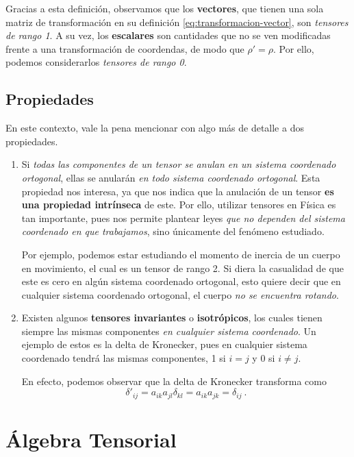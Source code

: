 Gracias a esta definición, observamos que los \textbf{vectores}, que tienen una sola matriz de transformación en su definición \eqref{eq:transformacion-vector}, son \emph{tensores de rango 1}. A su vez, los \textbf{escalares} son cantidades que no se ven modificadas frente a una transformación de coordendas, de modo que $\rho' = \rho$. Por ello, podemos considerarlos \emph{tensores de rango 0}.

\subsection{Propiedades}

En este contexto, vale la pena mencionar con algo más de detalle a dos propiedades.

\begin{enumerate}
    \item Si \emph{todas las componentes de un tensor se anulan en un sistema coordenado ortogonal}, ellas se anularán \emph{en todo sistema coordenado ortogonal}.  Esta propiedad nos interesa, ya que nos indica que la anulación de un tensor \textbf{es una propiedad intrínseca} de este. Por ello, utilizar tensores en Física es tan importante, pues nos permite plantear leyes \emph{que no dependen del sistema coordenado en que trabajamos}, sino únicamente del fenómeno estudiado.
    
    Por ejemplo, podemos estar estudiando el momento de inercia de un cuerpo en movimiento, el cual es un tensor de rango 2. Si diera la casualidad de que este es cero en algún sistema coordenado ortogonal, esto quiere decir que en cualquier sistema coordenado ortogonal, el cuerpo \emph{no se encuentra rotando}.

    \item Existen algunos \textbf{tensores invariantes} o \textbf{isotrópicos}, los cuales tienen siempre las mismas componentes \emph{en cualquier sistema coordenado}. Un ejemplo de estos es la delta de Kronecker, pues en cualquier sistema coordenado tendrá las mismas componentes, 1 si $i=j$ y 0 si $i\neq j$.
    
    En efecto, podemos observar que la delta de Kronecker transforma como
    \begin{equation}
        \delta'_{ij} = a_{ik} a_{jl} \delta_{kl} = a_{ik} a_{jk} = \delta_{ij} \ .
    \end{equation}
\end{enumerate}

\section{Álgebra Tensorial}

